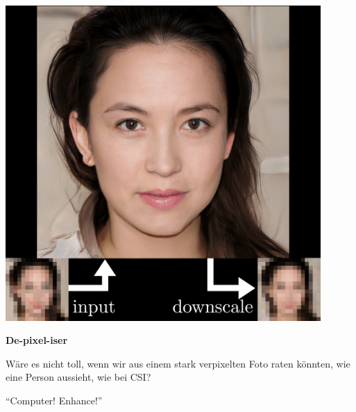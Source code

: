 \documentclass[aspectratio=169,usenames,dvipsnames]{beamer}
\begin{document}
\begin{frame}
\begin{minipage}{.5\textwidth}
\includegraphics[width=0.9\textwidth, keepaspectratio]{images/step10}
\end{minipage}\begin{minipage}{.5\textwidth}
\textbf{De-pixel-iser}
\bigskip

Wäre es nicht toll, wenn wir aus einem stark verpixelten Foto raten könnten, wie eine Person aussieht, wie bei CSI?
\bigskip

``Computer! Enhance!''
\end{minipage}
\end{frame}
\end{document}

